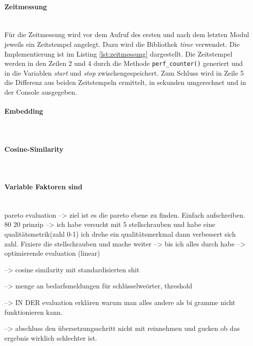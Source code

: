 \paragraph{Zeitmessung}\mbox{}\\
Für die Zeitmessung wird vor dem Aufruf des ersten und nach dem letzten Modul jeweils ein Zeitstempel angelegt. Dazu wird die Bibliothek \emph{time} verwendet.
Die Implementierung ist im Listing \ref{lst:zeitmessung} dargestellt. Die Zeitstempel werden in den Zeilen 2 und 4 durch die Methode \lstinline{perf_counter()}
generiert und in die Variablen \emph{start} und \emph{stop} zwischengespeichert. Zum Schluss wird in Zeile 5 die Differenz aus beiden Zeitstempeln ermittelt, in sekunden umgerechnet und in der Console ausgegeben.
\paragraph{Embedding}\mbox{}\\

\paragraph{Cosine-Similarity}\mbox{}\\

\paragraph{Variable Faktoren sind}\mbox{}\\
pareto evaluation --> ziel ist es die pareto ebene zu finden. Einfach aufschreiben. 80 20 prinzip --> ich habe versucht mit 5 stellschrauben und habe eine qualitätsmetrik(zahl 0-1) ich drehe ein qualitätsmerkmal dann verbessert sich zahl. Fixiere die stellschrauben und mache weiter --> bis ich alles durch habe --> optimierende evaluation (linear)

--> cosine similarity mit standardisierten shit

--> menge an bedarfsmeldungen für schlüsselweörter, threshold

--> IN DER evaluation erklären warum man alles andere als bi gramme nicht funktionieren kann.

--> abschluss den übersetzungsschritt nicht mit reinnehmen und gucken ob das ergebnis wirklich schlechter ist.

